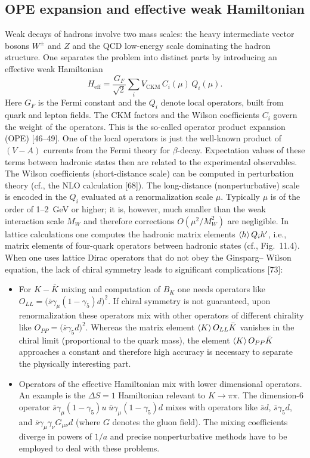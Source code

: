 \subsection{OPE expansion and effective weak Hamiltonian}
\label{sec:weak}
Weak decays of hadrons involve two mass scales: the heavy intermediate vector
bosons $W^\pm$ and $Z$ and the QCD low-energy scale dominating the hadron
structure. One separates the problem into distinct parts by introducing an
effective weak Hamiltonian
\begin{equation}
H_{\mathrm{eff}} = \frac{G_F}{\sqrt{2}} \sum_i V_{\mathrm{CKM}}\, C_i(\mu)\, Q_i(\mu) .
\end{equation}
Here $G_F$ is the Fermi constant and the $Q_i$ denote local operators, built from
quark and lepton fields. The CKM factors and the Wilson coefficients $C_i$ govern the weight of the operators. This is the so-called operator product expansion (OPE) [46--49]. One of the local operators is just the well-known product
of $(V - A)$ currents from the Fermi theory for $\beta$-decay. Expectation values
of these terms between hadronic states then are related to the experimental
observables.
The Wilson coefficients (short-distance scale) can be computed in perturbation theory (cf., the NLO calculation [68]). The long-distance (nonperturbative) scale is encoded in the $Q_i$ evaluated at a renormalization scale $\mu$.
Typically $\mu$ is of the order of 1--2~GeV or higher; it is, however, much smaller
than the weak interaction scale $M_W$ and therefore corrections
$O(\mu^2/M_W^2)$ are negligible. In lattice calculations one computes the hadronic matrix elements
$\left\langle h \right\rangle{Q_i}{h'}$, i.e., matrix elements of four-quark operators between hadronic
states (cf., Fig.~11.4).
When one uses lattice Dirac operators that do not obey the Ginsparg--
Wilson equation, the lack of chiral symmetry leads to significant complications [73]:
\begin{itemize}
\item For $K - \bar{K}$ mixing and computation of $B_K$ one needs operators like
$O_{LL} = \bigl(\bar{s}\gamma_\mu(1 - \gamma_5)d\bigr)^2$. If chiral symmetry is not guaranteed, upon
renormalization these operators mix with other operators of different chirality
like $O_{PP} = \bigl(\bar{s}\gamma_5 d\bigr)^2$. Whereas the matrix element $\left\langle K \right\rangle{O_{LL}}{\bar{K}}$ vanishes in
the chiral limit (proportional to the quark mass), the element $\left\langle K \right\rangle{O_{PP}}{\bar{K}}$
approaches a constant and therefore high accuracy is necessary to separate
the physically interesting part.
\item Operators of the effective Hamiltonian mix with lower dimensional operators. An example is the $\Delta S = 1$ Hamiltonian relevant to $K \to \pi\pi$. The
dimension-6 operator $\bar{s}\gamma_\mu(1 - \gamma_5)u\;\bar{u}\gamma_\mu(1 - \gamma_5)d$ mixes with operators like
$\bar{s}d$, $\bar{s}\gamma_5 d$, and $\bar{s}\gamma_\mu\gamma_\nu G_{\mu\nu} d$ (where $G$ denotes the gluon field). The mixing
coefficients diverge in powers of $1/a$ and precise nonperturbative methods
have to be employed to deal with these problems.
\end{itemize}

